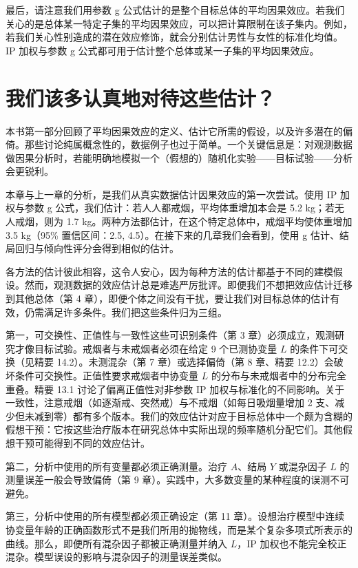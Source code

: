 最后，请注意我们用参数 g 公式估计的是整个目标总体的平均因果效应。若我们关心的是总体某一特定子集的平均因果效应，可以把计算限制在该子集内。例如，若我们关心性别造成的潜在效应修饰，就会分别估计男性与女性的标准化均值。IP 加权与参数 g 公式都可用于估计整个总体或某一子集的平均因果效应。

\section{我们该多认真地对待这些估计？}

本书第一部分回顾了平均因果效应的定义、估计它所需的假设，以及许多潜在的偏倚。那些讨论纯属概念性的，数据例子也过于简单。一个关键信息是：对观测数据做因果分析时，若能明确地模拟一个（假想的）随机化实验——目标试验——分析会更锐利。

本章与上一章的分析，是我们从真实数据估计因果效应的第一次尝试。使用 IP 加权与参数 g 公式，我们估计：若人人都戒烟，平均体重增加本会是 5.2 kg；若无人戒烟，则为 1.7 kg。两种方法都估计，在这个特定总体中，戒烟平均使体重增加 3.5 kg（95\% 置信区间：2.5, 4.5）。在接下来的几章我们会看到，使用 g 估计、结局回归与倾向性评分会得到相似的估计。

各方法的估计彼此相容，这令人安心，因为每种方法的估计都基于不同的建模假设。然而，观测数据的效应估计总是难逃严厉批评。即便我们不想把效应估计迁移到其他总体（第 4 章），即便个体之间没有干扰，要让我们对目标总体的估计有效，仍需满足许多条件。我们把这些条件归为三组。

第一，可交换性、正值性与一致性这些可识别条件（第 3 章）必须成立，观测研究才像目标试验。戒烟者与未戒烟者必须在给定 9 个已测协变量 $L$ 的条件下可交换（见精要 14.2）。未测混杂（第 7 章）或选择偏倚（第 8 章、精要 12.2）会破坏条件可交换性。正值性要求戒烟者中协变量 $L$ 的分布与未戒烟者中的分布完全重叠。精要 13.1 讨论了偏离正值性对非参数 IP 加权与标准化的不同影响。关于一致性，注意戒烟（如逐渐戒、突然戒）与不戒烟（如每日吸烟量增加 2 支、减少但未减到零）都有多个版本。我们的效应估计对应于目标总体中一个颇为含糊的假想干预：它按这些治疗版本在研究总体中实际出现的频率随机分配它们。其他假想干预可能得到不同的效应估计。

第二，分析中使用的所有变量都必须正确测量。治疗 $A$、结局 $Y$ 或混杂因子 $L$ 的测量误差一般会导致偏倚（第 9 章）。实践中，大多数变量的某种程度的误测不可避免。

第三，分析中使用的所有模型都必须正确设定（第 11 章）。设想治疗模型中连续协变量年龄的正确函数形式不是我们所用的抛物线，而是某个复杂多项式所表示的曲线。那么，即便所有混杂因子都被正确测量并纳入 $L$，IP 加权也不能完全校正混杂。模型误设的影响与混杂因子的测量误差类似。

